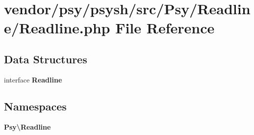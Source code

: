 \section{vendor/psy/psysh/src/\+Psy/\+Readline/\+Readline.php File Reference}
\label{_readline_8php}
\subsection*{Data Structures}
\begin{DoxyCompactItemize}
\item 
interface {\bf Readline}
\end{DoxyCompactItemize}
\subsection*{Namespaces}
\begin{DoxyCompactItemize}
\item 
 {\bf Psy\textbackslash{}\+Readline}
\end{DoxyCompactItemize}

